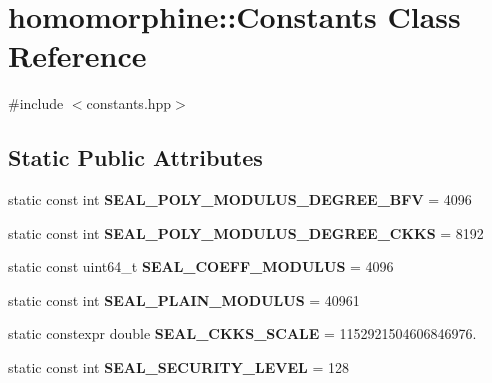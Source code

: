 \hypertarget{classhomomorphine_1_1_constants}{}\section{homomorphine\+::Constants Class Reference}
\label{classhomomorphine_1_1_constants}


{\ttfamily \#include $<$constants.\+hpp$>$}

\subsection*{Static Public Attributes}
\begin{DoxyCompactItemize}
\item 
\mbox{\label{classhomomorphine_1_1_constants_a354ff8671160245be639213c335a47dd}} 
static const int {\bfseries S\+E\+A\+L\+\_\+\+P\+O\+L\+Y\+\_\+\+M\+O\+D\+U\+L\+U\+S\+\_\+\+D\+E\+G\+R\+E\+E\+\_\+\+B\+FV} = 4096
\item 
\mbox{\label{classhomomorphine_1_1_constants_acc9b94c27229e11b88f013eb4c09f526}} 
static const int {\bfseries S\+E\+A\+L\+\_\+\+P\+O\+L\+Y\+\_\+\+M\+O\+D\+U\+L\+U\+S\+\_\+\+D\+E\+G\+R\+E\+E\+\_\+\+C\+K\+KS} = 8192
\item 
\mbox{\label{classhomomorphine_1_1_constants_ad87143078aecc13a757523a87ca5f6c1}} 
static const uint64\+\_\+t {\bfseries S\+E\+A\+L\+\_\+\+C\+O\+E\+F\+F\+\_\+\+M\+O\+D\+U\+L\+US} = 4096
\item 
\mbox{\label{classhomomorphine_1_1_constants_a4fea8db185713db5b7c0a9b455adb06e}} 
static const int {\bfseries S\+E\+A\+L\+\_\+\+P\+L\+A\+I\+N\+\_\+\+M\+O\+D\+U\+L\+US} = 40961
\item 
\mbox{\label{classhomomorphine_1_1_constants_ab10b8c769059fcf9f04f16963c384677}} 
static constexpr double {\bfseries S\+E\+A\+L\+\_\+\+C\+K\+K\+S\+\_\+\+S\+C\+A\+LE} = 1152921504606846976.
\item 
\mbox{\label{classhomomorphine_1_1_constants_a3eb0cdf60add8c31fdb68c1df36fd27c}} 
static const int {\bfseries S\+E\+A\+L\+\_\+\+S\+E\+C\+U\+R\+I\+T\+Y\+\_\+\+L\+E\+V\+EL} = 128

\end{DoxyCompactItemize}
